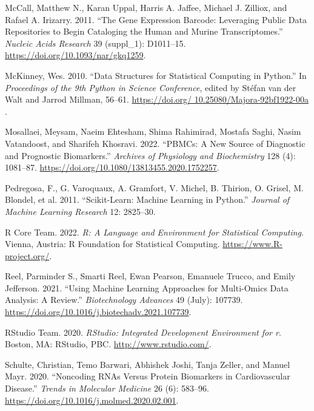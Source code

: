 \documentclass[smallextended]{svjour3}       %
\newlength{\cslhangindent}
\newlength{\cslentryspacingunit} %
\newenvironment{CSLReferences}[2] %
 {%
  \setlength{\parindent}{0pt}
  \ifodd #1
  \let\oldpar\par
  \def\par{\hangindent=\cslhangindent\oldpar}
  \fi
  \setlength{\parskip}{#2\cslentryspacingunit}
 }%
 {}
\begin{document}
\begin{CSLReferences}{1}{0}
\leavevmode{}%
McCall, Matthew N., Karan Uppal, Harris A. Jaffee, Michael J. Zilliox,
and Rafael A. Irizarry. 2011. {``The {Gene} {Expression} {Barcode}:
Leveraging Public Data Repositories to Begin Cataloging the Human and
Murine Transcriptomes.''} \emph{Nucleic Acids Research} 39 (suppl\_1):
D1011--15. \url{https://doi.org/10.1093/nar/gkq1259}.

\leavevmode{}%
McKinney, Wes. 2010. {``{D}ata {S}tructures for {S}tatistical
{C}omputing in {P}ython.''} In \emph{{P}roceedings of the 9th {P}ython
in {S}cience {C}onference}, edited by Stéfan van der Walt and Jarrod
Millman, 56--61.
\href{https://doi.org/\%2010.25080/Majora-92bf1922-00a\%20}{https://doi.org/
10.25080/Majora-92bf1922-00a }.

\leavevmode{}%
Mosallaei, Meysam, Naeim Ehtesham, Shima Rahimirad, Mostafa Saghi, Nasim
Vatandoost, and Sharifeh Khosravi. 2022. {``{PBMCs}: A New Source of
Diagnostic and Prognostic Biomarkers.''} \emph{Archives of Physiology
and Biochemistry} 128 (4): 1081--87.
\url{https://doi.org/10.1080/13813455.2020.1752257}.

\leavevmode{}%
Pedregosa, F., G. Varoquaux, A. Gramfort, V. Michel, B. Thirion, O.
Grisel, M. Blondel, et al. 2011. {``Scikit-Learn: Machine Learning in
{P}ython.''} \emph{Journal of Machine Learning Research} 12: 2825--30.

\leavevmode{}%
R Core Team. 2022. \emph{R: A Language and Environment for Statistical
Computing}. Vienna, Austria: R Foundation for Statistical Computing.
\url{https://www.R-project.org/}.

\leavevmode{}%
Reel, Parminder S., Smarti Reel, Ewan Pearson, Emanuele Trucco, and
Emily Jefferson. 2021. {``Using Machine Learning Approaches for
Multi-Omics Data Analysis: {A} Review.''} \emph{Biotechnology Advances}
49 (July): 107739.
\url{https://doi.org/10.1016/j.biotechadv.2021.107739}.

\leavevmode{}%
RStudio Team. 2020. \emph{RStudio: Integrated Development Environment
for r}. Boston, MA: RStudio, PBC. \url{http://www.rstudio.com/}.

\leavevmode{}%
Schulte, Christian, Temo Barwari, Abhishek Joshi, Tanja Zeller, and
Manuel Mayr. 2020. {``Noncoding {RNAs} Versus {Protein} {Biomarkers} in
{Cardiovascular} {Disease}.''} \emph{Trends in Molecular Medicine} 26
(6): 583--96. \url{https://doi.org/10.1016/j.molmed.2020.02.001}.


\end{CSLReferences}
\end{document}
